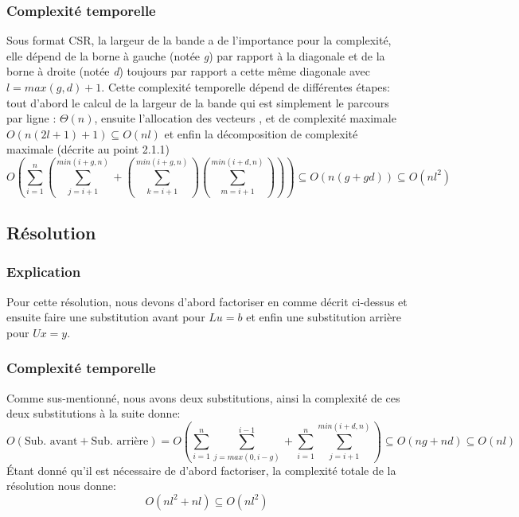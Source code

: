 \documentclass{article}[11pt]
\begin{document}
\subsubsection{Complexité temporelle}
Sous format CSR, la largeur de la bande a de l'importance pour la complexité, elle dépend de la borne à gauche (notée \textit{g}) par rapport à la diagonale et de la borne à droite (notée \textit{d}) toujours par rapport a cette même diagonale avec $l=max(g,d)+1$.
Cette complexité temporelle dépend de différentes étapes: tout d'abord le calcul de la largeur de la bande qui est simplement le parcours par ligne : $\Theta(n)$, ensuite l'allocation des vecteurs ,  et  de complexité maximale $O(n(2l+1)+1)\subseteq O(nl)$ et enfin la décomposition de complexité maximale (décrite au point 2.1.1) $$O\left( \sum_{i=1}^n\left( \sum_{j=i+1}^{min(i+g,n)} + \left( \sum_{k=i+1}^{min(i+g,n)}\right)\left( \sum_{m=i+1}^{min(i+d,n)}\right)\right)\right)\subseteq O(n(g+gd)) \subseteq O(nl^2)$$

\subsection{Résolution}
\label{sub:LUres}
\subsubsection{Explication}
Pour cette résolution, nous devons d'abord factoriser en  comme décrit ci-dessus et ensuite faire une substitution avant pour $Lu=b$ et enfin une substitution arrière pour $Ux=y$.
\subsubsection{Complexité temporelle}
Comme sus-mentionné, nous avons deux substitutions, ainsi la complexité de ces deux substitutions à la suite donne:
$$O(\text{Sub. avant} + \text{Sub. arrière}) = O\left( \sum_{i=1}^{n} \sum_{j=max(0,i-g)}^{i-1} +  \sum_{i=1}^{n} \sum_{j=i+1}^{min(i+d,n)}\right) \subseteq O(ng + nd) \subseteq O(nl)$$
Étant donné qu'il est nécessaire de d'abord factoriser, la complexité totale de la résolution nous donne:
$$O(nl^2+nl) \subseteq O(nl^2)$$
\end{document}
